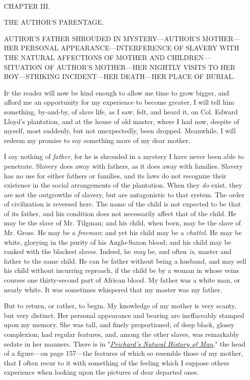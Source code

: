 {}

~

{CHAPTER III.}

THE AUTHOR'S PARENTAGE.

{AUTHOR'S FATHER SHROUDED IN MYSTERY---AUTHOR'S MOTHER---HER PERSONAL
APPEARANCE---INTERFERENCE OF SLAVERY WITH THE NATURAL AFFECTIONS OF
MOTHER AND CHILDREN---SITUATION OF AUTHOR'S MOTHER---HER NIGHTLY VISITS
TO HER BOY---STRIKING INCIDENT---HER DEATH---HER PLACE OF BURIAL.}

\textsc{If} the reader will now be kind enough to allow me time to grow
bigger, and afford me an opportunity for my experience to become
greater, I will tell him something, by-and-by, of slave life, as I saw,
felt, and heard it, on Col. Edward Lloyd's plantation, and at the house
of old master, where I had now, despite of myself, most suddenly, but
not unexpectedly, been dropped. Meanwhile, I will redeem my promise to
say something more of my dear mother.

I say nothing of \emph{father}, for he is shrouded in a mystery I have
never been able to penetrate. Slavery does away with fathers, as it does
away with families. Slavery has no use for either fathers or families,
and its laws do not recognize their existence in the social arrangements
of the plantation. When they \emph{do} exist, they are not the
outgrowths of slavery, but are antagonistic to that system. The order of
civilization is reversed here. The name of the child is not expected to
be that of its father, and his {}condition does not necessarily affect
that of the child. He may be the slave of Mr. Tilgman; and his child,
when born, may be the slave of Mr. Gross. He may be a \emph{freeman};
and yet his child may be a \emph{chattel}. He may be white, glorying in
the purity of his Anglo-Saxon blood; and his child may be ranked with
the blackest slaves. Indeed, he \emph{may} be, and often \emph{is},
master and father to the same child. He can be father without being a
husband, and may sell his child without incurring reproach, if the child
be by a woman in whose veins courses one thirty-second part of African
blood. My father was a white man, or nearly white. It was sometimes
whispered that my master was my father.

But to return, or rather, to begin. My knowledge of my mother is very
scanty, but very distinct. Her personal appearance and bearing are
ineffaceably stamped upon my memory. She was tall, and finely
proportioned; of deep black, glossy complexion; had regular features,
and, among the other slaves, was remarkably sedate in her manners. There
is in
"\emph{\href{/w/index.php?title=The_Natural_History_of_Man_(Prichard)\&action=edit\&redlink=1}{Prichard's
Natural History of Man}}," the head of a figure---on page 157---the
features of which so resemble those of my mother, that I often recur to
it with something of the feeling which I suppose others experience when
looking upon the pictures of dear departed ones.

